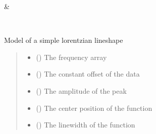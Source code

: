 \documentclass[letterpaper,10pt,english]{sphinxmanual}
\begin{document}
\begin{fulllineitems}
\begin{savenotes}
\begin{longtable}{}
\endlastfoot
\sphinxtableatstartofbodyhook

\sphinxAtStartPar
{\hyperref[\detokenize{source/_autosummary/HDF5_BLS_treat.Models:HDF5_BLS_treat.Models.models}]{}}
&
\sphinxAtStartPar

\\
\sphinxbottomrule
\end{longtable}
\sphinxtableafterendhook
\sphinxatlongtableend
\end{savenotes}

\begin{fulllineitems}
\label{\detokenize{source/_autosummary/HDF5_BLS_treat.Models:HDF5_BLS_treat.Models.DHO}}
\pysigstartsignatures
\pysiglinewithargsret
{}
{\sphinxparamcomma {}\sphinxparamcomma {}\sphinxparamcomma {}\sphinxparamcomma {}\sphinxparamcomma {}}
{}
\pysigstopsignatures
\sphinxAtStartPar
Model of a simple lorentzian lineshape
\begin{quote}\begin{description}
\begin{itemize}
\item {} 
\sphinxAtStartPar
{} () \textendash{} The frequency array

\item {} 
\sphinxAtStartPar
{} () \textendash{} The constant offset of the data

\item {} 
\sphinxAtStartPar
{} () \textendash{} The amplitude of the peak

\item {} 
\sphinxAtStartPar
{} () \textendash{} The center position of the function

\item {} 
\sphinxAtStartPar
{} () \textendash{} The linewidth of the function


\end{itemize}
\end{description}
\end{quote}
\end{fulllineitems}
\end{fulllineitems}
\end{document}
